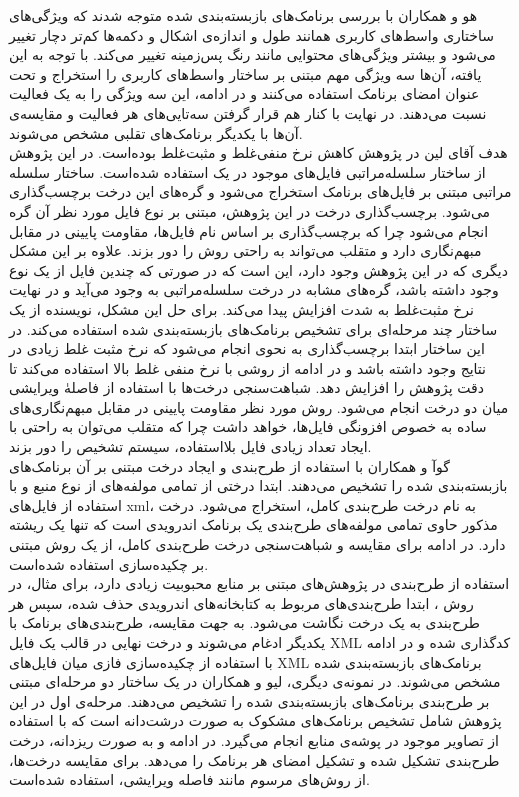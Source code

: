 هو و همکاران با بررسی برنامک‌های بازبسته‌بندی شده متوجه‌ شدند که ویژگی‌های ساختاری واسط‌های کاربری‌ همانند طول و اندازه‌ی اشکال و دکمه‌ها کم‌تر دچار تغییر می‌شود و بیشتر ویژگی‌های محتوایی مانند رنگ پس‌زمینه تغییر می‌کند. با توجه به این یافته، آن‌ها سه ویژگی مهم مبتنی بر ساختار واسط‌های کاربری را استخراج و تحت عنوان امضا‌ی برنامک استفاده می‌کنند و در ادامه، این سه ویژگی را به یک فعالیت نسبت می‌دهند. در نهایت با کنار هم قرار گرفتن سه‌تایی‌های هر فعالیت و مقایسه‌ی آن‌ها با یکدیگر برنامک‌های تقلبی مشخص می‌شوند.\\
هدف آقای لین در پژوهش  کاهش نرخ منفی‌غلط و مثبت‌غلط بوده‌است. در این پژوهش از ساختار سلسله‌مراتبی‌ فایل‌های موجود در یک  استفاده شده‌است. ساختار سلسله مراتبی مبتنی بر فایل‌های برنامک استخراج می‌شود و گره‌های این درخت برچسب‌گذاری می‌شود. برچسب‌گذاری درخت در این پژوهش، مبتنی بر نوع فایل‌ مورد نظر آن گره انجام می‌شود چرا که برچسب‌گذاری بر اساس نام فایل‌ها، مقاومت پایینی در مقابل مبهم‌نگاری دارد و متقلب می‌‌تواند به راحتی روش را دور بزند. علاوه بر این مشکل دیگری که در این پژوهش وجود دارد، این است که در صورتی که چندین فایل از یک نوع وجود داشته باشد، گره‌های مشابه در درخت سلسله‌مراتبی به وجود می‌آید و در نهایت نرخ مثبت‌غلط به شدت افزایش پیدا‌ می‌کند. برای حل این مشکل، نویسنده‌ از یک ساختار چند مرحله‌ای برای تشخیص برنامک‌های بازبسته‌بندی شده استفاده می‌کند. در این ساختار ابتدا برچسب‌گذاری به نحوی انجام می‌شود که نرخ مثبت غلط زیادی در نتایج وجود داشته باشد و در ادامه از روشی با نرخ منفی غلط بالا استفاده می‌کند تا دقت پژوهش را افزایش دهد. شباهت‌سنجی درخت‌ها با استفاده از فاصلهٰ ویرایشی میان دو درخت انجام می‌شود. روش مورد نظر مقاومت پایینی در مقابل مبهم‌نگاری‌های ساده به خصوص افزونگی فایل‌ها، خواهد داشت چرا که متقلب می‌توان به راحتی با ایجاد تعداد زیادی فایل بلااستفاده، سیستم تشخیص را دور بزند.\\
گوآ و همکاران با استفاده از طرح‌بندی‌ و ایجاد درخت مبتنی بر آن برنامک‌های بازبسته‌بندی شده را تشخیص می‌دهند. ابتدا درختی از تمامی مولفه‌های از نوع منبع و با استفاده از فایل‌های xml، به نام درخت طرح‌بندی کامل‌، استخراج می‌شود. درخت مذکور حاوی تمامی مولفه‌های طرح‌بندی یک برنامک اندرویدی است که تنها یک ریشته دارد. در ادامه برای مقایسه‌ و شباهت‌سنجی درخت طرح‌بندی کامل، از یک روش مبتنی بر چکیده‌سازی  استفاده شده‌است. \\ استفاده از طرح‌بندی در پژوهش‌های مبتنی بر منابع محبوبیت زیادی دارد، برای مثال، در روش ، ابتدا طرح‌بندی‌های مربوط به کتابخانه‌های اندرویدی حذف شده، سپس هر طرح‌بندی به یک درخت نگاشت می‌شود. به جهت مقایسه، طرح‌بندی‌های برنامک با یکدیگر ادغام می‌شوند و درخت نهایی در قالب یک فایل XML کدگذاری شده و در ادامه با استفاده از چکیده‌سازی فازی میان فایل‌های XML برنامک‌های بازبسته‌بندی شده مشخص می‌شوند. در نمونه‌ی دیگری، لیو و همکاران در یک ساختار دو مرحله‌ای مبتنی بر طرح‌بندی برنامک‌های بازبسته‌بندی شده را تشخیص می‌دهند. مرحله‌ی اول در این پژوهش شامل تشخیص برنامک‌های مشکوک به صورت درشت‌دانه‌ است که با استفاده از تصاویر موجود در پوشه‌ی منابع انجام می‌گیرد. در ادامه و به صورت ریز‌دانه، درخت طرح‌بندی تشکیل شده و تشکیل امضا‌ی هر برنامک را می‌دهد. برای مقایسه درخت‌ها، از روش‌های مرسوم مانند فاصله ویرایشی، استفاده شده‌است.\\

